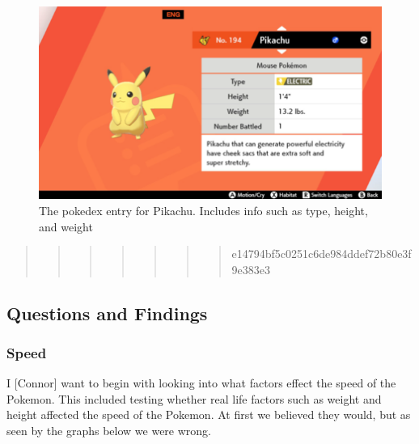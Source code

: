 \documentclass[
]{article}
\begin{document}
\begin{figure}
\centering
\includegraphics{"./Pokedex_Picture"}
\caption{The pokedex entry for Pikachu. Includes info such as type,
height, and weight}
\end{figure}

\begin{quote}
\begin{quote}
\begin{quote}
\begin{quote}
\begin{quote}
\begin{quote}
\begin{quote}
e14794bf5c0251c6de984ddef72b80e3f9e383e3
\end{quote}
\end{quote}
\end{quote}
\end{quote}
\end{quote}
\end{quote}
\end{quote}

\hypertarget{questions-and-findings}{%
\subsection{Questions and Findings}\label{questions-and-findings}}

\hypertarget{speed}{%
\subsubsection{Speed}\label{speed}}

I {[}Connor{]} want to begin with looking into what factors effect the
speed of the Pokemon. This included testing whether real life factors
such as weight and height affected the speed of the Pokemon. At first we
believed they would, but as seen by the graphs below we were wrong.
\end{document}
